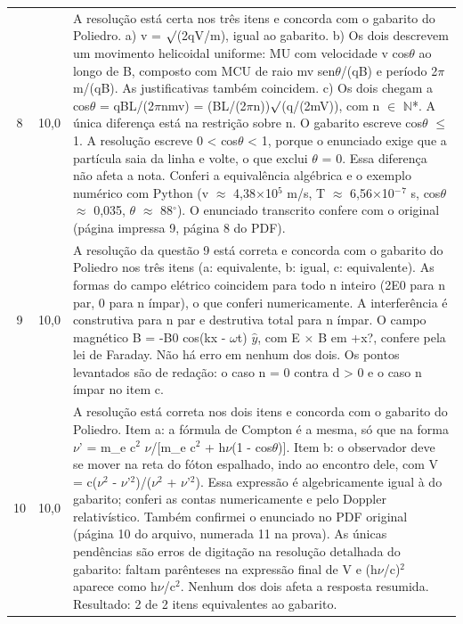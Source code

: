 \documentclass{article}%
\begin{document}
\begin{longtable}{@{}c c p{}@{}}
8 & 10,0 & A resolução está certa nos três itens e concorda com o gabarito do Poliedro. a) v = $\surd$(2qV/m), igual ao gabarito. b) Os dois descrevem um movimento helicoidal uniforme: MU com velocidade v cos$\theta$ ao longo de B, composto com MCU de raio mv sen$\theta$/(qB) e período 2$\pi$m/(qB). As justificativas também coincidem. c) Os dois chegam a cos$\theta$ = qBL/(2$\pi$nmv) = (BL/(2$\pi$n))$\surd$(q/(2mV)), com n $\in$ $\mathbb{N}$*. A única diferença está na restrição sobre n. O gabarito escreve cos$\theta$ $\leq$ 1. A resolução escreve 0 < cos$\theta$ < 1, porque o enunciado exige que a partícula saia da linha e volte, o que exclui $\theta$ = 0. Essa diferença não afeta a nota. Conferi a equivalência algébrica e o exemplo numérico com Python (v $\approx$ 4,38$\times$10$^{5}$ m/s, T $\approx$ 6,56$\times$10$^{-}$$^{7}$ s, cos$\theta$ $\approx$ 0,035, $\theta$ $\approx$ 88$^\circ$). O enunciado transcrito confere com o original (página impressa 9, página 8 do PDF). \\
9 & 10,0 & A resolução da questão 9 está correta e concorda com o gabarito do Poliedro nos três itens (a: equivalente, b: igual, c: equivalente). As formas do campo elétrico coincidem para todo n inteiro (2E0 para n par, 0 para n ímpar), o que conferi numericamente. A interferência é construtiva para n par e destrutiva total para n ímpar. O campo magnético B = -B0 cos(kx - $\omega$t) $\hat y$, com E $\times$ B em +x?, confere pela lei de Faraday. Não há erro em nenhum dos dois. Os pontos levantados são de redação: o caso n = 0 contra d > 0 e o caso n ímpar no item c. \\
10 & 10,0 & A resolução está correta nos dois itens e concorda com o gabarito do Poliedro. Item a: a fórmula de Compton é a mesma, só que na forma $\nu$' = m\_e c$^2$ $\nu$/{[}m\_e c$^2$ + h$\nu$(1 - cos$\theta$){]}. Item b: o observador deve se mover na reta do fóton espalhado, indo ao encontro dele, com V = c($\nu$$^2$ - $\nu$'$^2$)/($\nu$$^2$ + $\nu$'$^2$). Essa expressão é algebricamente igual à do gabarito; conferi as contas numericamente e pelo Doppler relativístico. Também confirmei o enunciado no PDF original (página 10 do arquivo, numerada 11 na prova). As únicas pendências são erros de digitação na resolução detalhada do gabarito: faltam parênteses na expressão final de V e (h$\nu$/c)$^2$ aparece como h$\nu$/c$^2$. Nenhum dos dois afeta a resposta resumida. Resultado: 2 de 2 itens equivalentes ao gabarito. \\
\bottomrule\end{longtable}%
\end{document}
